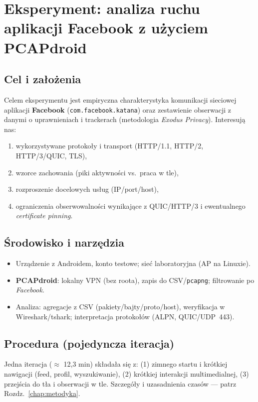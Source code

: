 \chapter{Eksperyment: analiza ruchu aplikacji Facebook z użyciem PCAPdroid}
\label{chap:eksperyment-facebook}

\section{Cel i założenia}
Celem eksperymentu jest empiryczna charakterystyka komunikacji sieciowej aplikacji \textbf{Facebook} (\texttt{com.facebook.katana}) oraz zestawienie obserwacji z danymi o uprawnieniach i trackerach (metodologia \emph{Exodus Privacy}). Interesują nas:
\begin{enumerate}
  \item wykorzystywane protokoły i transport (HTTP/1.1, HTTP/2, HTTP/3/QUIC, TLS),
  \item wzorce zachowania (piki aktywności vs.\ praca w tle),
  \item rozproszenie docelowych usług (IP/port/host),
  \item ograniczenia obserwowalności wynikające z QUIC/HTTP/3 i ewentualnego \emph{certificate pinning}.
\end{enumerate}

\section{Środowisko i narzędzia}
\begin{itemize}
  \item Urządzenie z Androidem, konto testowe; sieć laboratoryjna (AP na Linuxie).
  \item \textbf{PCAPdroid}: lokalny VPN (bez roota), zapis do CSV/\texttt{pcapng}; filtrowanie po \emph{Facebook}.
  \item Analiza: agregacje z CSV (pakiety/bajty/proto/host), weryfikacja w Wireshark/tshark; interpretacja protokołów (ALPN, QUIC/UDP~443).
\end{itemize}

\section{Procedura (pojedyncza iteracja)}
Jedna iteracja ($\approx$ 12{,}3 min) składała się z: (1) zimnego startu i krótkiej nawigacji (feed, profil, wyszukiwanie), (2) krótkiej interakcji multimedialnej, (3) przejścia do tła i obserwacji w tle. Szczegóły i uzasadnienia czasów — patrz Rozdz.\ \ref{chap:metodyka}.

